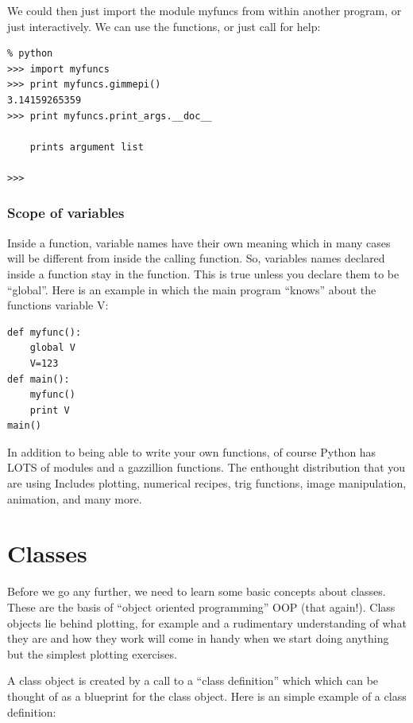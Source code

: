 \documentclass[11pt]{book}
\begin{document}
{{\noindent We could then just import the module {\color{blue}myfuncs} from within another program, or just interactively. We can use the functions, or just call for help:

{ \color{blue} \begin{verbatim}
% python
>>> import myfuncs
>>> print myfuncs.gimmepi()
3.14159265359
>>> print myfuncs.print_args.__doc__

    prints argument list

>>>
\end{verbatim}}

\subsubsection{Scope of variables}

Inside a function,  variable names have their own meaning  which in many cases will be different from inside the calling function.  So,  variables names declared inside a function stay in the function.  This is true unless you declare them to be ``global''.
Here is an example in which the main program  ``knows'' about the functions variable {\color{blue}V}:

{ \color{blue} \begin{verbatim}
def myfunc():
    global V
    V=123
def main():
    myfunc()
    print V
main()
\end{verbatim}}







In addition to being able to write your own functions, of course
Python has LOTS of modules and a gazzillion functions. The enthought distribution that you are using
Includes plotting, numerical recipes, trig functions, image manipulation, animation,  and many more.



\section{Classes}

Before we go any further, we need to learn some basic concepts about classes. These
 are the basis of  ``object oriented programming'' OOP (that again!).   Class objects lie behind plotting, for example and a rudimentary understanding of what they are and how they work will come in handy when we start doing anything but the simplest plotting exercises.

  A class object is   created by a call  to a ``class definition''  which which can be thought of as a blueprint for the class object.  Here is an simple example of a class definition:

}}
\end{document}
